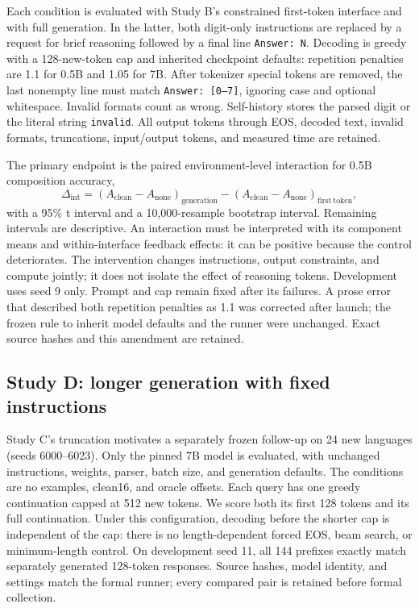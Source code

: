 \documentclass[11pt]{article}
\begin{document}
Each condition is evaluated with Study B's constrained first-token interface
and with full generation. In the latter, both digit-only instructions are
replaced by a request for brief reasoning followed by a final line
\texttt{Answer: N}. Decoding is greedy with a 128-new-token cap and inherited
checkpoint defaults: repetition penalties are 1.1 for 0.5B and 1.05 for 7B.
After tokenizer special tokens are removed, the last nonempty line must match
\texttt{Answer: [0--7]}, ignoring case and optional whitespace. Invalid formats
count as wrong. Self-history stores the parsed digit or the literal string
\texttt{invalid}. All output tokens through EOS, decoded text, invalid formats,
truncations, input/output tokens, and measured time are retained.

The primary endpoint is the paired environment-level interaction for 0.5B
composition accuracy,
\[
 \Delta_{\mathrm{int}}=
 (A_{\mathrm{clean}}-A_{\mathrm{none}})_{\mathrm{generation}}
 -(A_{\mathrm{clean}}-A_{\mathrm{none}})_{\mathrm{first\ token}},
\]
with a 95\% t interval and a 10,000-resample bootstrap interval. Remaining
intervals are descriptive. An interaction must be interpreted with its component
means and within-interface feedback effects: it can be positive because the
control deteriorates. The intervention changes instructions, output constraints,
and compute jointly; it does not isolate the effect of reasoning tokens.
Development uses seed 9 only. Prompt and cap remain fixed after its failures.
A prose error that described both repetition penalties as 1.1 was corrected
after launch; the frozen rule to inherit model defaults and the runner were
unchanged. Exact source hashes and this amendment are retained.

\subsection{Study D: longer generation with fixed instructions}
Study C's truncation motivates a separately frozen follow-up on 24 new
languages (seeds 6000--6023). Only the pinned 7B model is evaluated, with
unchanged instructions, weights, parser, batch size, and generation defaults.
The conditions are no examples, clean16, and oracle offsets. Each query has
one greedy continuation capped at 512 new tokens. We score both its first
128 tokens and its full continuation. Under this configuration, decoding before
the shorter cap is independent of the cap: there is no length-dependent forced
EOS, beam search, or minimum-length control. On development seed 11, all 144
prefixes exactly match separately generated 128-token responses. Source hashes,
model identity, and settings match the formal runner; every compared pair is
retained before formal collection.
\end{document}
